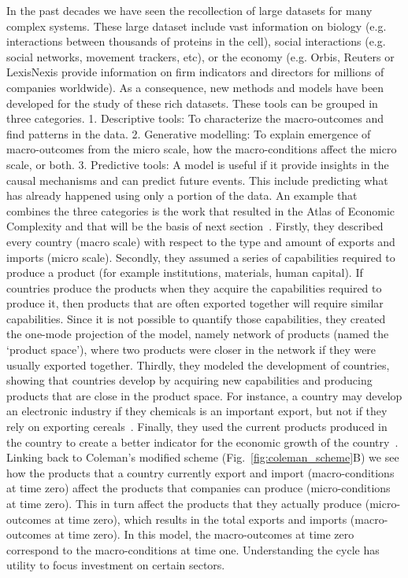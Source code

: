 In the past decades we have seen the recollection of large datasets for many complex systems. 
These large dataset include vast information on biology (e.g. interactions between thousands of proteins in the cell),
social interactions (e.g. social networks, movement trackers, etc),
or the economy (e.g. Orbis, Reuters or LexisNexis provide information on firm indicators and directors for millions of companies worldwide).
As a consequence, new methods and models have been developed for the study of these rich datasets. 
These tools can be grouped in three categories.
1. Descriptive tools: To characterize the macro-outcomes and find patterns in the data.
2. Generative modelling: To explain emergence of macro-outcomes from the micro scale, how the macro-conditions affect the micro scale, or both.
3. Predictive tools: A model is useful if it provide insights in the causal mechanisms and can predict future events. This include predicting what has already happened using only a portion of the data. 
An example that combines the three categories is the work that resulted in the Atlas of Economic Complexity and that will be the basis of next section~\citep{Hausmann2006,hidalgo2007,hidalgo2009,hausmann2011}.
Firstly, they described every country (macro scale) with respect to the type and amount of exports and imports (micro scale). 
Secondly, they assumed a series of capabilities required to produce a product (for example institutions, materials, human capital). 
If countries produce the products when they acquire the capabilities required to produce it, 
then products that are often exported together will require similar capabilities.
Since it is not possible to quantify those capabilities, they created the one-mode projection of the model,
namely network of products (named the `product space'), where two products were closer in the network if they were usually exported together. 
Thirdly, they modeled the development of countries, showing that countries develop by acquiring new capabilities and producing products that are close in the product space.
For instance, a country may develop an electronic industry if they chemicals is an important export, 
but not if they rely on exporting cereals~\citep{hidalgo2007}. 
Finally, they used the current products produced in the country to create a better indicator for the economic growth of the country~\citep{hausmann2011}.
Linking back to Coleman’s modified scheme (Fig.~\ref{fig:coleman_scheme}B) we see how the products that a country currently export and import (macro-conditions at time zero) affect the products that companies can produce (micro-conditions at time zero). 
This in turn affect the products that they actually produce (micro-outcomes at time zero), 
which results in the total exports and imports (macro-outcomes at time zero).
In this model, the macro-outcomes at time zero correspond to the macro-conditions at time one. 
Understanding the cycle has utility to focus investment on certain sectors.


